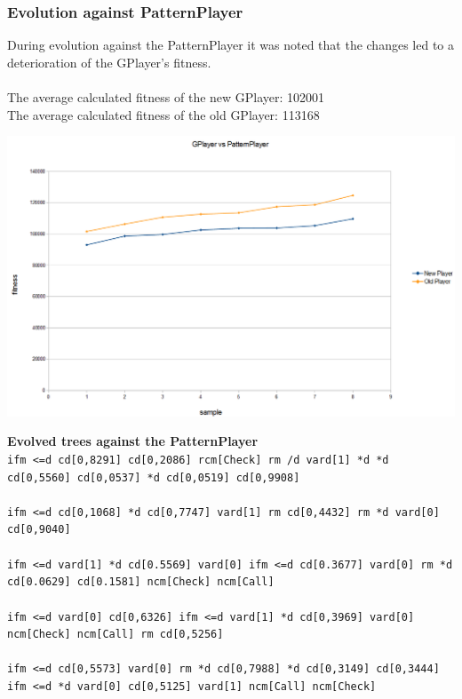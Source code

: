 \documentclass[12pt,fleqn,a4paper]{article}
\begin{document}
\subsubsection{Evolution against PatternPlayer}
During evolution against the PatternPlayer it was noted that the changes led to a deterioration of the GPlayer's fitness.  \\ \\
The average calculated fitness of the new GPlayer: 102001\\
The average calculated fitness of the old GPlayer: 113168
\begin{center}
	\includegraphics[width=.9\textwidth]{gp_vs_pp_1.png}
\end{center}
\textbf{Evolved trees against the PatternPlayer}\\ 
\texttt{ifm <=d cd[0,8291] cd[0,2086] rcm[Check] rm /d vard[1] *d *d cd[0,5560] cd[0,0537] *d cd[0,0519] cd[0,9908]} \\ \\
\texttt{ifm <=d cd[0,1068] *d cd[0,7747] vard[1] rm cd[0,4432] rm *d vard[0] cd[0,9040]}\\ \\
\texttt{ifm <=d vard[1] *d cd[0.5569] vard[0] ifm <=d cd[0.3677] vard[0] rm *d cd[0.0629] cd[0.1581] ncm[Check] ncm[Call]}\\ \\
\texttt{ifm <=d vard[0] cd[0,6326] ifm <=d vard[1] *d cd[0,3969] vard[0] ncm[Check] ncm[Call] rm cd[0,5256]}\\ \\
\texttt{ifm <=d cd[0,5573] vard[0] rm *d cd[0,7988] *d cd[0,3149] cd[0,3444] ifm <=d *d vard[0] cd[0,5125] vard[1] ncm[Call] ncm[Check]}
\end{document}
